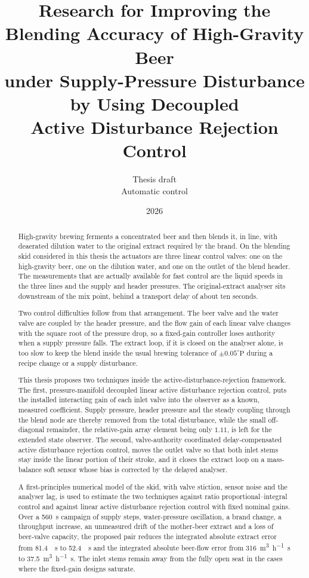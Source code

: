 \documentclass[12pt,a4paper]{report}
\title{%
Research for Improving the Blending Accuracy of High-Gravity Beer\\
under Supply-Pressure Disturbance by Using Decoupled\\
Active Disturbance Rejection Control}
\author{Thesis draft\\[0.6em]\large Automatic control}
\date{2026}
\newcommand{\degP}{^{\circ}\mathrm{P}}
\begin{document}
\maketitle
\thispagestyle{empty}

\begin{abstract}
\noindent
High-gravity brewing ferments a concentrated beer and then blends it, in line, with deaerated dilution water to the original extract required by the brand. On the blending skid considered in this thesis the actuators are three linear control valves: one on the high-gravity beer, one on the dilution water, and one on the outlet of the blend header. The measurements that are actually available for fast control are the liquid speeds in the three lines and the supply and header pressures. The original-extract analyser sits downstream of the mix point, behind a transport delay of about ten seconds.

Two control difficulties follow from that arrangement. The beer valve and the water valve are coupled by the header pressure, and the flow gain of each linear valve changes with the square root of the pressure drop, so a fixed-gain controller loses authority when a supply pressure falls. The extract loop, if it is closed on the analyser alone, is too slow to keep the blend inside the usual brewing tolerance of $\pm 0.05\degP$ during a recipe change or a supply disturbance.

This thesis proposes two techniques inside the active-disturbance-rejection framework. The first, pressure-manifold decoupled linear active disturbance rejection control, puts the installed interacting gain of each inlet valve into the observer as a known, measured coefficient. Supply pressure, header pressure and the steady coupling through the blend node are thereby removed from the total disturbance, while the small off-diagonal remainder, the relative-gain array element being only $1.11$, is left for the extended state observer. The second, valve-authority coordinated delay-compensated active disturbance rejection control, moves the outlet valve so that both inlet stems stay inside the linear portion of their stroke, and it closes the extract loop on a mass-balance soft sensor whose bias is corrected by the delayed analyser.

A first-principles numerical model of the skid, with valve stiction, sensor noise and the analyser lag, is used to estimate the two techniques against ratio proportional--integral control and against linear active disturbance rejection control with fixed nominal gains. Over a \SI{560}{s} campaign of supply steps, water-pressure oscillation, a brand change, a throughput increase, an unmeasured drift of the mother-beer extract and a loss of beer-valve capacity, the proposed pair reduces the integrated absolute extract error from \SI{81.4}{\plato\second} to \SI{52.4}{\plato\second} and the integrated absolute beer-flow error from \SI{316}{\cubic\metre\per\hour\second} to \SI{37.5}{\cubic\metre\per\hour\second}. The inlet stems remain away from the fully open seat in the cases where the fixed-gain designs saturate.
\end{abstract}
\end{document}
